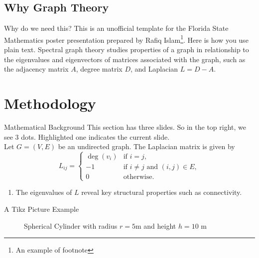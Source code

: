 \documentclass{ctexbeamer}
\begin{document}
\subsection{Why Graph Theory}
\begin{frame}{Why do we need this?}
This is an unofficial template for the Florida State Mathematics poster presentation prepared by Rafiq Islam\footnote{An example of footnote}. Here is how you use plain text. Spectral graph theory studies properties of a graph in relationship to the eigenvalues and eigenvectors of matrices associated with the graph, such as the adjacency matrix $A$, degree matrix $D$, and Laplacian $L = D - A$.
\end{frame}
\section{Methodology}
\begin{frame}{Mathematical Background}
    This section has three slides. So in the top right, we see 3 dots. Highlighted one indicates the current slide.\\
    Let $G = (V, E)$ be an undirected graph. The Laplacian matrix is given by
        \[
        L_{ij} =
        \begin{cases}
        \deg(v_i) & \text{if } i = j, \\
        -1 & \text{if } i \neq j \text{ and } (i,j) \in E, \\
        0 & \text{otherwise}.
        \end{cases}
        \]
    \begin{enumerate}
        \item The eigenvalues of $L$ reveal key structural properties such as connectivity.
    \end{enumerate}
\end{frame}
\begin{frame}{A Tikz Picture Example}
    \begin{figure}
        \centering
        \caption{ Spherical Cylinder with radius $r=5$m and height $h=10$ m}
        \label{fig:fig1}
    \end{figure}
\end{frame}
\end{document}
